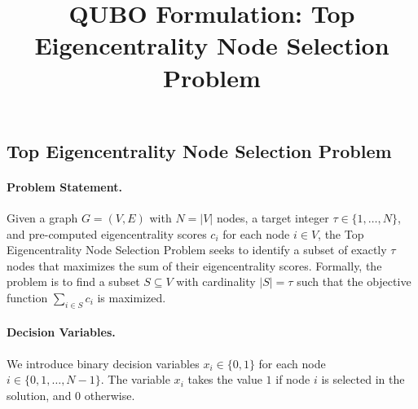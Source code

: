 \documentclass[12pt]{article}
\title{QUBO Formulation: Top Eigencentrality Node Selection Problem}
\date{}
\begin{document}
\maketitle

\subsection*{Top Eigencentrality Node Selection Problem}

\paragraph{Problem Statement.}
Given a graph $G=(V, E)$ with $N = |V|$ nodes, a target integer $\tau \in \{1, \dots, N\}$, and pre-computed eigencentrality scores $c_i$ for each node $i \in V$, the Top Eigencentrality Node Selection Problem seeks to identify a subset of exactly $\tau$ nodes that maximizes the sum of their eigencentrality scores. Formally, the problem is to find a subset $S \subseteq V$ with cardinality $|S| = \tau$ such that the objective function $\sum_{i \in S} c_i$ is maximized.

\paragraph{Decision Variables.}
We introduce binary decision variables $x_i \in \{0, 1\}$ for each node $i \in \{0, 1, \dots, N-1\}$. The variable $x_i$ takes the value $1$ if node $i$ is selected in the solution, and $0$ otherwise.
\end{document}
